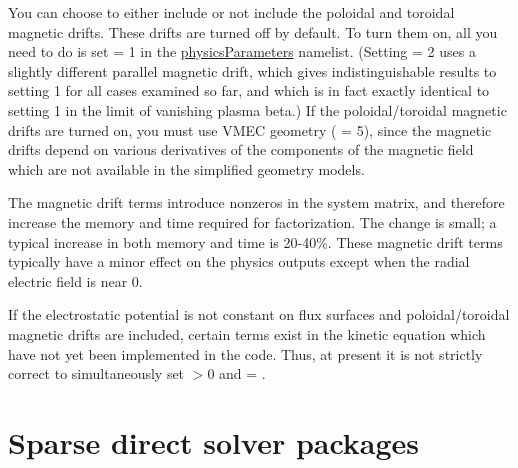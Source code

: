 You can choose to either include or not include the poloidal and toroidal magnetic drifts.
These drifts are turned off by default.  To turn them on, all you need to do is
set  = 1 in the {\ttfamily \hyperref[sec:physicsParameters]{physicsParameters}} namelist.
(Setting  = 2 uses a slightly different parallel magnetic drift, which gives
indistinguishable results to setting 1 for all cases examined so far, and which is in fact exactly identical to setting 1
in the limit of vanishing plasma beta.)
If the poloidal/toroidal magnetic drifts are turned on, you must use VMEC
geometry ( = 5), since the magnetic drifts
depend on various derivatives of the components of the magnetic field which
are not available in the simplified geometry models.

The magnetic drift terms introduce nonzeros in the system matrix,
and therefore increase the memory and time required for factorization.
The change is small; a typical increase in both memory and time is 20-40\%.
These magnetic drift terms typically have a minor effect on the physics outputs except when the radial
electric field is near 0.

If the electrostatic potential is not constant on flux surfaces and poloidal/toroidal magnetic drifts
are included, certain terms exist in the kinetic equation which have not yet been implemented in the code.
Thus, at present it is not strictly correct to simultaneously set   $> 0$ 
and   = \true.

\section{Sparse direct solver packages}
\label{sec:solvers}

